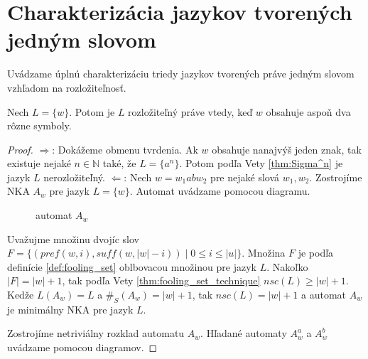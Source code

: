 \section{Charakterizácia jazykov tvorených jedným slovom}
Uvádzame úplnú charakterizáciu triedy jazykov tvorených práve jedným slovom vzhľadom na rozložiteľnosť.

\begin{theorem}
\label{thm:singleton_characterization}
Nech $ L = \lbrace w \rbrace $. Potom je $ L $ rozložiteľný práve vtedy, keď $ w $ obsahuje aspoň dva rôzne symboly.
\end{theorem}

\begin{proof}
$ \Rightarrow $: Dokážeme obmenu tvrdenia. Ak $ w $ obsahuje nanajvýš jeden znak, tak existuje nejaké $ n \in \mathbb{N} $ také, že $ L = \lbrace a^n \rbrace $. Potom podľa Vety \ref{thm:Sigma^n} je jazyk $ L $ nerozložiteľný.
$ \Leftarrow $: Nech $ w = w_1abw_2 $ pre nejaké slová $ w_1,w_2 $. Zostrojíme NKA $ A_w $ pre jazyk $ L = \lbrace w \rbrace $. Automat uvádzame pomocou diagramu.

\begin{figure}[H]
\centering
{}
\caption{automat $ A_w $}
\end{figure}

Uvažujme množinu dvojíc slov $ F = \lbrace (pref(w,i),suff(w,|w|-i)) \; | \; 0 \leq i \leq |u| \rbrace $. Množina $ F $ je podľa definície \ref{def:fooling_set} oblbovacou množinou pre jazyk $ L $. Nakoľko $ |F| = |w|+1 $, tak podľa Vety \ref{thm:fooling_set_technique} $ nsc(L) \geq |w|+1 $. Kedže $ L(A_w) = L $ a $ \#_S(A_w) = |w|+1 $, tak $ nsc(L) = |w|+1 $ a automat $ A_w $ je minimálny NKA pre jazyk $ L $.
\par
Zostrojíme netriviálny rozklad automatu $ A_w $. Hľadané automaty $ A^a_w $ a $ A^b_w $ uvádzame pomocou diagramov.


\end{proof}
